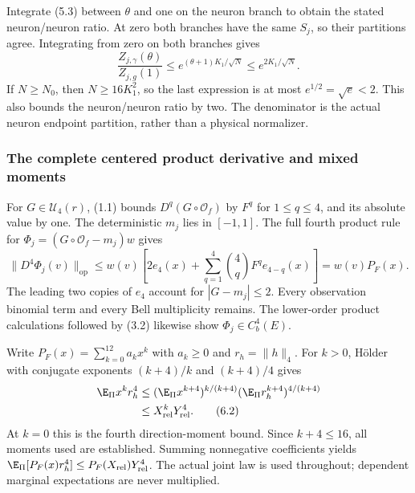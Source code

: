 Integrate (5.3) between $\theta$ and one on the neuron branch to obtain
the stated neuron/neuron ratio. At zero both branches have the same
$S_j$, so their partitions agree. Integrating from zero on both branches gives
\begin{equation}
 \frac{Z_{j,\gamma}(\theta)}{Z_{j,g}(1)}
 \le e^{(\theta+1)K_1/\sqrt N}\le e^{2K_1/\sqrt N}.\tag{5.5}
\end{equation}
If $N\ge N_0$, then $N\ge16K_1^2$, so the last expression is at most
$e^{1/2}=\sqrt e<2$. This also bounds the neuron/neuron ratio by two.
The denominator is the actual neuron endpoint partition, rather than a
physical normalizer.

\subsubsection{The complete centered product derivative and mixed moments}
For $G\in\mathcal U_4(r)$, (1.1) bounds
$D^q(G\circ\mathcal O_f)$ by $F^q$ for $1\le q\le4$, and its absolute
value by one. The deterministic $m_j$ lies in $[-1,1]$.
The full fourth product rule for $\Phi_j=(G\circ\mathcal O_f-m_j)w$ gives
\begin{equation}
 \|D^4\Phi_j(v)\|_{\mathrm{op}}
 \le w(v)\left[2e_4(x)+\sum_{q=1}^4\binom4qF^q e_{4-q}(x)\right]
 =w(v)P_F(x).\tag{6.1}
\end{equation}
The leading two copies of $e_4$ account for $|G-m_j|\le2$.
Every observation binomial term and every Bell multiplicity remains.
The lower-order product calculations followed by (3.2) likewise show
$\Phi_j\in C_b^4(E)$.

Write $P_F(x)=\sum_{k=0}^{12}a_kx^k$ with $a_k\ge0$ and
$r_h=\|h\|_4$. For $k>0$, H\"older with conjugate exponents
$(k+4)/k$ and $(k+4)/4$ gives
\begin{align}
 \E_\Pi x^kr_h^4
 &\le(\E_\Pi x^{k+4})^{k/(k+4)}
          (\E_\Pi r_h^{k+4})^{4/(k+4)}\notag\\
 &\le X_{\mathrm{rel}}^kY_{\mathrm{rel}}^4.\tag{6.2}
\end{align}
At $k=0$ this is the fourth direction-moment bound. Since $k+4\le16$,
all moments used are established. Summing nonnegative coefficients yields
$\E_\Pi[P_F(x)r_h^4]\le P_F(X_{\mathrm{rel}})Y_{\mathrm{rel}}^4$.
The actual joint law is used throughout; dependent marginal expectations
are never multiplied.

